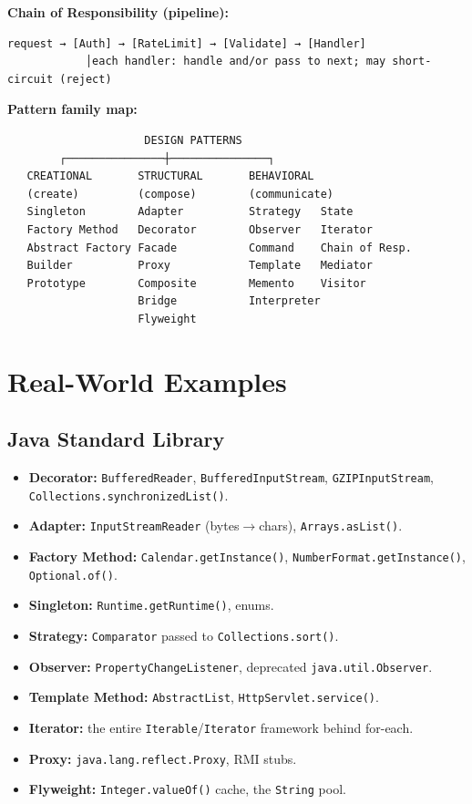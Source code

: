 \documentclass[11pt]{article}
\providecommand{\tightlist}{\setlength{\itemsep}{1pt}\setlength{\parskip}{0pt}}
\begin{document}
\textbf{Chain of Responsibility (pipeline):}

\setcodelang{}

\begin{verbatim}
request → [Auth] → [RateLimit] → [Validate] → [Handler]
            │each handler: handle and/or pass to next; may short-circuit (reject)
\end{verbatim}

\textbf{Pattern family map:}

\setcodelang{}

\begin{verbatim}
                     DESIGN PATTERNS
        ┌───────────────┼───────────────┐
   CREATIONAL       STRUCTURAL       BEHAVIORAL
   (create)         (compose)        (communicate)
   Singleton        Adapter          Strategy   State
   Factory Method   Decorator        Observer   Iterator
   Abstract Factory Facade           Command    Chain of Resp.
   Builder          Proxy            Template   Mediator
   Prototype        Composite        Memento    Visitor
                    Bridge           Interpreter
                    Flyweight
\end{verbatim}

\section{Real-World Examples}\label{real-world-examples}

\subsection{Java Standard Library}\label{java-standard-library}

\begin{itemize}
\tightlist
\item
  \textbf{Decorator:} \texttt{BufferedReader}, \texttt{BufferedInputStream}, \texttt{GZIPInputStream}, \texttt{Collections.synchronizedList()}.
\item
  \textbf{Adapter:} \texttt{InputStreamReader} (bytes\(\rightarrow\)chars), \texttt{Arrays.asList()}.
\item
  \textbf{Factory Method:} \texttt{Calendar.getInstance()}, \texttt{NumberFormat.getInstance()}, \texttt{Optional.of()}.
\item
  \textbf{Singleton:} \texttt{Runtime.getRuntime()}, enums.
\item
  \textbf{Strategy:} \texttt{Comparator} passed to \texttt{Collections.sort()}.
\item
  \textbf{Observer:} \texttt{PropertyChangeListener}, deprecated \texttt{java.util.Observer}.
\item
  \textbf{Template Method:} \texttt{AbstractList}, \texttt{HttpServlet.service()}.
\item
  \textbf{Iterator:} the entire \texttt{Iterable}/\texttt{Iterator} framework behind for-each.
\item
  \textbf{Proxy:} \texttt{java.lang.reflect.Proxy}, RMI stubs.
\item
  \textbf{Flyweight:} \texttt{Integer.valueOf()} cache, the \texttt{String} pool.
\end{itemize}
\end{document}
